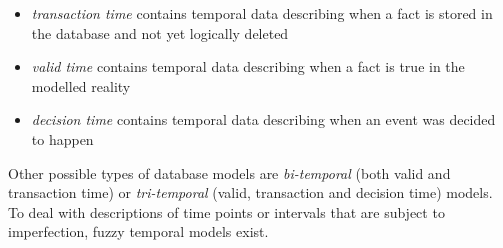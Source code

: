 \vspace{-5pt}
\begin{itemize}
	\item \emph{transaction time} \cite{Dyreson1994} contains temporal data describing when a fact is stored in the database and not yet logically deleted
	\item	\emph{valid time} \cite{Dyreson1994} contains temporal data describing when a fact is true in the modelled reality
	\item	\emph{decision time} \cite{Nascimento95} contains temporal data describing when an event was decided to happen
\end{itemize}
\vspace{-5pt}

Other possible types of database models are \emph{bi-temporal} (both valid and transaction time) \cite{Dyreson1994} or \emph{tri-temporal} (valid, transaction and decision time) \cite{Nascimento95} models. To deal with descriptions of time points \cite{Dubois89} or intervals \cite{Garrido2009} that are subject to imperfection, fuzzy temporal models \cite{schockaert08} exist. %

	



